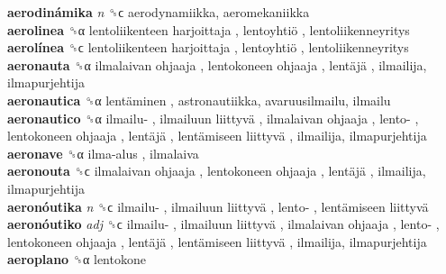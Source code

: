 \textbf{aerodinámika} \emph{n}  ␝ϲ  aerodynamiikka, aeromekaniikka  \\
\textbf{aerolinea} ␝α   lentoliikenteen harjoittaja ,  lentoyhtiö , lentoliikenneyritys  \\
\textbf{aerolínea} ␝ϲ   lentoliikenteen harjoittaja ,  lentoyhtiö , lentoliikenneyritys  \\
\textbf{aeronauta} ␝α   ilmalaivan ohjaaja ,  lentokoneen ohjaaja ,  lentäjä , ilmailija, ilmapurjehtija  \\
\textbf{aeronautica} ␝α   lentäminen , astronautiikka, avaruusilmailu, ilmailu  \\
\textbf{aeronautico} ␝α   ilmailu- ,  ilmailuun liittyvä ,  ilmalaivan ohjaaja ,  lento- ,  lentokoneen ohjaaja ,  lentäjä ,  lentämiseen liittyvä , ilmailija, ilmapurjehtija  \\
\textbf{aeronave} ␝α   ilma-alus , ilmalaiva  \\
\textbf{aeronouta} ␝ϲ   ilmalaivan ohjaaja ,  lentokoneen ohjaaja ,  lentäjä , ilmailija, ilmapurjehtija  \\
\textbf{aeronóutika} \emph{n}  ␝ϲ   ilmailu- ,  ilmailuun liittyvä ,  lento- ,  lentämiseen liittyvä   \\
\textbf{aeronóutiko} \emph{adj}  ␝ϲ   ilmailu- ,  ilmailuun liittyvä ,  ilmalaivan ohjaaja ,  lento- ,  lentokoneen ohjaaja ,  lentäjä ,  lentämiseen liittyvä , ilmailija, ilmapurjehtija  \\
\textbf{aeroplano} ␝α  lentokone  \\

